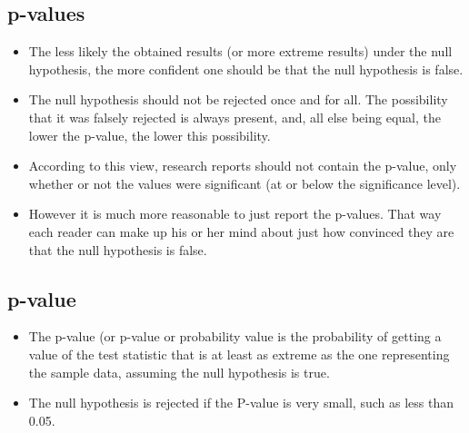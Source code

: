 \documentclass[]{report}
\begin{document}
	
	
	
	\subsection{p-values}
	\begin{itemize}
		\item The less likely the obtained results (or more extreme results) under the null hypothesis, the more confident one should be that the null hypothesis is false. \item The null hypothesis should not be rejected once and for all. The possibility that it was falsely rejected is always present, and, all else being equal, the lower the p-value, the lower this possibility.
		\item According to this view, research reports should not contain the p-value, only whether or not the values were significant (at or below the significance level).
		\item
		However it is much more reasonable to just report the p-values. That way each reader can make up his or her mind about just how convinced they are that the null hypothesis is false.
	\end{itemize}
	
	
	
	
	\subsection{p-value}
	\begin{itemize}
		\item The p-value (or p-value or probability value is the probability of getting a value of the test statistic that is at least as extreme as the one representing the sample data, assuming the null hypothesis is true.
		\item The null hypothesis is rejected if the P-value is very small, such as less than 0.05.
	\end{itemize}
	
	
	
	
	
	
	
	
	
\end{document}
